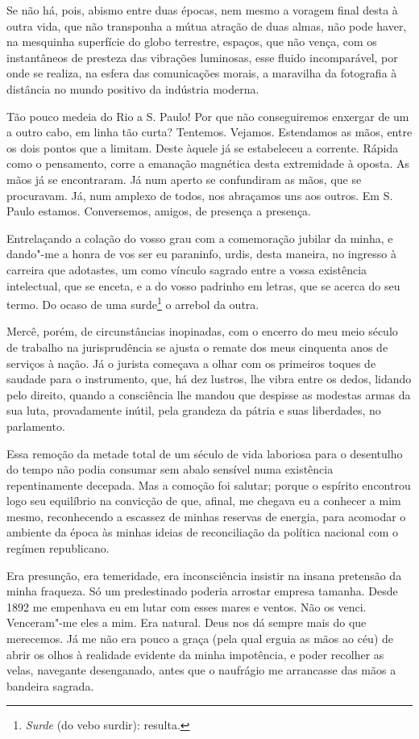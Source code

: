 Se não há, pois, abismo entre duas épocas, nem mesmo a voragem
final desta à outra vida, que não transponha a mútua atração de duas
almas, não pode haver, na mesquinha superfície do globo terrestre,
espaços, que não vença, com os instantâneos de presteza das vibrações
luminosas, esse fluido incomparável, por onde se realiza, na esfera das
comunicações morais, a maravilha da fotografia à distância no mundo
positivo da indústria moderna.

Tão pouco medeia do Rio a S. Paulo! Por que não conseguiremos
enxergar de um a outro cabo, em linha tão curta? Tentemos. Vejamos.
Estendamos as mãos, entre os dois pontos que a limitam. Deste àquele já
se estabeleceu a corrente. Rápida como o pensamento, corre a emanação
magnética desta extremidade à oposta. As mãos já se encontraram. Já num
aperto se confundiram as mãos, que se procuravam. Já, num amplexo de
todos, nos abraçamos uns aos outros. Em S. Paulo estamos. Conversemos,
amigos, de presença a presença.

Entrelaçando a colação do vosso grau com a comemoração jubilar da
minha, e dando"-me a honra de vos ser eu paraninfo, urdis, desta
maneira, no ingresso à carreira que adotastes, um como vínculo sagrado
entre a vossa existência intelectual, que se enceta, e a do vosso
padrinho em letras, que se acerca do seu termo. Do ocaso
de uma surde\footnote{ \textit{Surde} (do vebo surdir): resulta.} o arrebol da outra.

Mercê, porém, de circunstâncias inopinadas, com o encerro do meu
meio século de trabalho na jurisprudência se ajusta o remate dos meus
cinquenta anos de serviços à nação. Já o jurista começava a olhar com
os primeiros toques de saudade para o instrumento, que, há dez lustros,
lhe vibra entre os dedos, lidando pelo direito, quando a consciência
lhe mandou que despisse as modestas armas da sua luta, provadamente
inútil, pela grandeza da pátria e suas liberdades, no parlamento.

Essa remoção da metade total de um século de vida laboriosa para o
desentulho do tempo não podia consumar sem abalo sensível numa
existência repentinamente decepada. Mas a comoção foi salutar; porque o
espírito encontrou logo seu equilíbrio na convicção de que, afinal, me
chegava eu a conhecer a mim mesmo, reconhecendo a escassez de minhas
reservas de energia, para acomodar o ambiente da época às minhas ideias
de reconciliação da política nacional com o regímen republicano.

Era presunção, era temeridade, era inconsciência insistir na
insana pretensão da minha fraqueza. Só um predestinado poderia arrostar
empresa tamanha. Desde 1892 me empenhava eu em lutar com esses mares e
ventos. Não os venci. Venceram"-me eles a mim. Era natural. Deus nos dá
sempre mais do que merecemos. Já me não era pouco a graça (pela qual
erguia as mãos ao céu) de abrir os olhos à realidade evidente da minha
impotência, e poder recolher as velas, navegante desenganado, antes que
o naufrágio me arrancasse das mãos a bandeira sagrada.

